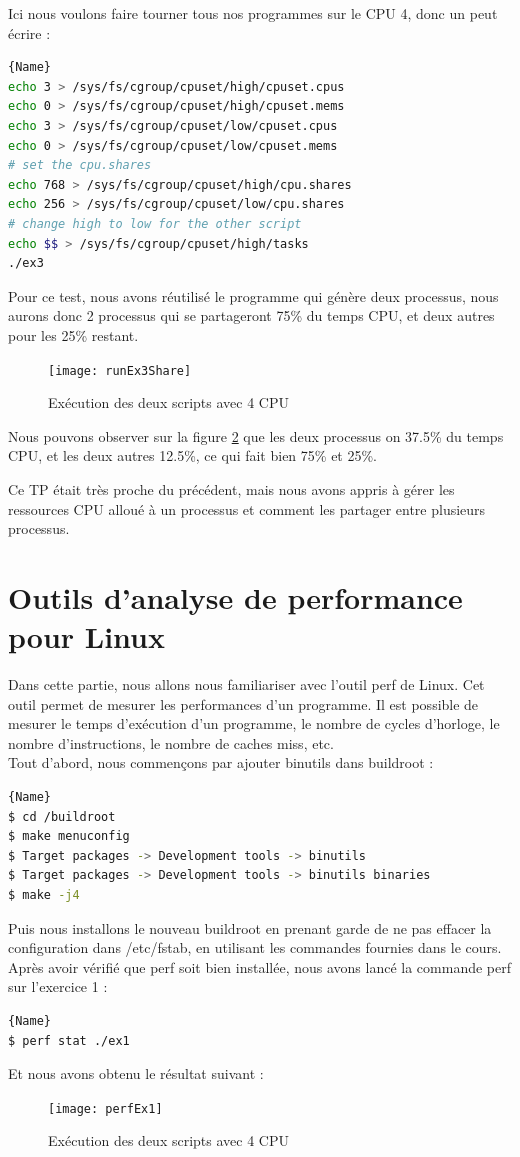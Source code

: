 \documentclass[
	a4paper, %
	10pt, %
]{CSUniSchoolLabReport}
\begin{document}
\begin{enumerate}[label=\textbf{\arabic*}]
Ici nous voulons faire tourner tous nos programmes sur le CPU 4, donc un peut \'ecrire :
\begin{lstlisting}[language=bash, firstnumber=1]{Name}
echo 3 > /sys/fs/cgroup/cpuset/high/cpuset.cpus
echo 0 > /sys/fs/cgroup/cpuset/high/cpuset.mems
echo 3 > /sys/fs/cgroup/cpuset/low/cpuset.cpus
echo 0 > /sys/fs/cgroup/cpuset/low/cpuset.mems
# set the cpu.shares
echo 768 > /sys/fs/cgroup/cpuset/high/cpu.shares
echo 256 > /sys/fs/cgroup/cpuset/low/cpu.shares
# change high to low for the other script
echo $$ > /sys/fs/cgroup/cpuset/high/tasks 
./ex3
\end{lstlisting}
Pour ce test, nous avons réutilis\'e le programme qui g\'en\`ere deux processus, nous aurons donc 2 processus qui se partageront 75\% du temps CPU, et deux autres pour les 25\% restant.
\begin{figure}[H]
	\centering
	\texttt{[image: runEx3Share]}
	\caption{Ex\'ecution des deux scripts avec 4 CPU}
	\label{fig:runEx3Share}
\end{figure}
Nous pouvons observer sur la figure \ref{fig:runEx3Share} que les deux processus on 37.5\% du temps CPU, et les deux autres 12.5\%, ce qui fait bien 75\% et 25\%.

Ce TP était tr\`es proche du pr\'ec\'edent, mais nous avons appris à g\'erer les ressources CPU alloué à un processus et comment les partager entre plusieurs processus.
\end{enumerate}


\section{Outils d'analyse de performance pour Linux}
Dans cette partie, nous allons nous familiariser avec l'outil perf de Linux. Cet outil permet de mesurer les performances d'un programme. Il est possible de mesurer le temps d'ex\'ecution d'un programme, le nombre de cycles d'horloge, le nombre d'instructions, le nombre de caches miss, etc.\\

Tout d'abord, nous commen\c{c}ons par ajouter binutils dans buildroot :
\begin{lstlisting}[language=bash, firstnumber=1]{Name}
$ cd /buildroot
$ make menuconfig
$ Target packages -> Development tools -> binutils
$ Target packages -> Development tools -> binutils binaries
$ make -j4
\end{lstlisting}

Puis nous installons le nouveau buildroot en prenant garde de ne pas effacer la configuration dans /etc/fstab, en utilisant les commandes fournies dans le cours.
Apr\`es avoir v\'erifié que perf soit bien installée, nous avons lancé la commande perf sur l'exercice 1 :
\begin{lstlisting}[language=bash, firstnumber=1]{Name}
$ perf stat ./ex1
\end{lstlisting}
Et nous avons obtenu le r\'esultat suivant :
\begin{figure}[H]
	\centering
	\texttt{[image: perfEx1]}
	\caption{Ex\'ecution des deux scripts avec 4 CPU}
	\label{fig:runEx3Share}
\end{figure}
\end{document}
